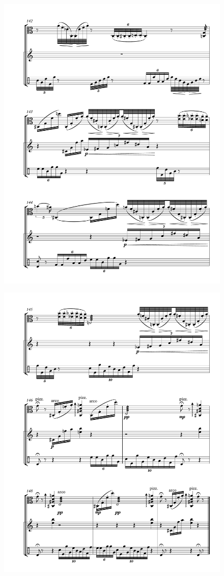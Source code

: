 \begin{figure}[htbp]
    \centering
	\includegraphics[width=6.5in]{figures/Viola_Percussion_21.pdf}
\end{figure}

\begin{figure}[htbp]
    \centering
	\includegraphics[width=6.5in]{figures/Viola_Percussion_22.pdf}
\end{figure}
